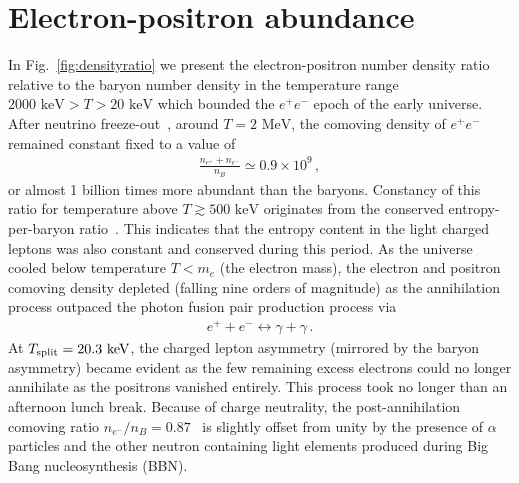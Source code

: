 \documentclass[a4paper]{article}
\newcommand*{\MeV}{\text{ MeV}}
\newcommand*{\keV}{\text{ keV}}
\newcommand{\rf}[1]{Fig.~{\ref{#1}}}
\begin{document}
\section{Electron-positron abundance}
\label{sec:abundance}

\noindent In \rf{fig:densityratio} we present the electron-positron number density ratio relative to the baryon number density in the temperature range $2000\keV>T>20\keV$ which bounded the $e^{+}e^{-}$ epoch of the early universe. After neutrino freeze-out~\cite{birrell2014relic}, around $T=2\MeV$, the comoving density of $e^{+}e^{-}$ remained constant fixed to a value of 
\begin{align}
    \label{comovingdensity}
    \frac{n_{e^{+}}+n_{e^{-}}}{n_{B}}\simeq0.9\times10^{9}\,,
\end{align}
or almost 1 billion times more abundant than the baryons. Constancy of this ratio for temperature above $T\gtrsim500\keV$ originates from the conserved entropy-per-baryon ratio~\cite{fromerth2012quarkgluon}. This indicates that the entropy content in the light charged leptons was also constant and conserved during this period. As the universe cooled below temperature $T<m_{e}$ (the electron mass), the electron and positron comoving density depleted (falling nine orders of magnitude) as the annihilation process outpaced the photon fusion pair production process via
\begin{align}
    \label{fusion}
    e^{+}+e^{-}\leftrightarrow\gamma+\gamma\,.
\end{align}
At $T_{\rm split}=20.3\keV$, the charged lepton asymmetry (mirrored by the baryon asymmetry) became evident as the few remaining excess electrons could no longer annihilate as the positrons vanished entirely. This process took no longer than an afternoon lunch break. Because of charge neutrality, the post-annihilation comoving ratio $n_{e^{-}}/n_{B}=0.87$~\cite{rafelski2023short} is slightly offset from unity by the presence of $\alpha$ particles and the other neutron containing light elements produced during Big Bang nucleosynthesis (BBN).

\end{document}
